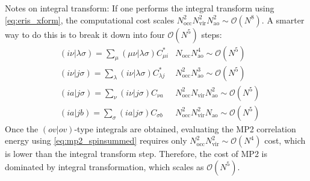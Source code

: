 \documentclass[parskip=full]{article}
\newcommand{\myblue}[1]{\textcolor{myblue}{#1}}
\begin{document}
    \myblue{Notes on integral transform:
    If one performs the integral transform using \cref{eq:eris_xform}, the computational cost scales $N_{\textrm{occ}}^2 N_{\textrm{vir}}^2 N_{\textrm{ao}}^2 \sim \mathcal{O}(N^8)$.
    A smarter way to do this is to break it down into four $\mathcal{O}(N^5)$ steps:
    \begin{subequations}
    \begin{align}
        &(i\nu|\lambda\sigma)
            = \sum_{\mu} (\mu\nu|\lambda\sigma) C^*_{\mu i}
        &N_{\textrm{occ}} N_{\textrm{ao}}^4 \sim \mathcal{O}(N^5) \\
        &(i\nu|j\sigma)
            = \sum_{\lambda} (i\nu|\lambda\sigma) C^*_{\lambda j}
        &N_{\textrm{occ}}^2 N_{\textrm{ao}}^3 \sim \mathcal{O}(N^5) \\
        &(ia|j\sigma)
            = \sum_{\nu} (i\nu|j\sigma) C_{\nu a}
        &N_{\textrm{occ}}^2 N_{\textrm{vir}} N_{\textrm{ao}}^2 \sim \mathcal{O}(N^5) \\
        &(ia|jb)
            = \sum_{\sigma} (ia|j\sigma) C_{\sigma b}
        &N_{\textrm{occ}}^2 N_{\textrm{vir}}^2 N_{\textrm{ao}} \sim \mathcal{O}(N^5)
    \end{align}
    \end{subequations}
    Once the $(ov|ov)$-type integrals are obtained, evaluating the MP2 correlation energy using \cref{eq:mp2_spinsummed} requires only $N_{\textrm{occ}}^2 N_{\textrm{vir}}^2 \sim \mathcal{O}(N^4)$ cost, which is lower than the integral transform step.
    Therefore, the cost of MP2 is dominated by integral transformation, which scales as $\mathcal{O}(N^5)$.
    }



\end{document}
